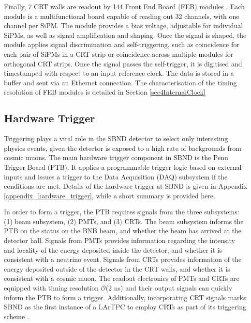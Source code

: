 Finally, 7 CRT walls are readout by 144 Front End Board (FEB) modules \cite{crt_note}.%
Each module is a multifunctional board capable of reading out 32 channels, with one channel per SiPM. 
The module provides a bias voltage, adjustable for individual SiPMs, as well as signal amplification and shaping.
Once the signal is shaped, the module applies signal discrimination and self-triggering, such as coincidence for each pair of SiPMs in a CRT strip or coincidence across multiple modules for orthogonal CRT strips. 
Once the signal passes the self-trigger, it is digitised and timestamped with respect to an input reference clock. 
The data is stored in a buffer and sent via an Ethernet connection. 
The characterisation of the timing resolution of FEB modules is detailed in Section \ref{sec4InternalClock}

\subsection{Hardware Trigger}
\label{sec:sbnd_trigger}

Triggering plays a vital role in the SBND detector to select only interesting physics events, given the detector is exposed to a high rate of backgrounds from cosmic muons. 
The main hardware trigger component in SBND is the Penn Trigger Board (PTB).
It applies a programmable trigger logic based on external inputs and issues a trigger to the Data Acquisition (DAQ) subsystem if the conditions are met.
Details of the hardware trigger at SBND is given in Appendix \ref{appendix_hardware_trigger}, while a short summary is provided here.

In order to form a trigger, the PTB requires signals from the three subsystems: (1) beam subsystem, (2) PMTs, and (3) CRTs.
The beam subsystem informs the PTB on the status on the BNB beam, and whether the beam has arrived at the detector hall.
Signals from PMTs provides information regarding the intensity and locality of the energy deposited inside the detector, and whether it is consistent with a neutrino event.
Signals from CRTs provides information of the energy deposited outside of the detector in the CRT walls, and whether it is consistent with a cosmic muon. 
The readout electronics of PMTs and CRTs are equipped with timing resolution $\mathcal{O}$(2 ns) and their output signals can quickly inform the PTB to form a trigger.
Additionally, incorporating CRT signals marks SBND as the first instance of a LArTPC to employ CRTs as part of its triggering scheme \cite{CPAD2022}.

